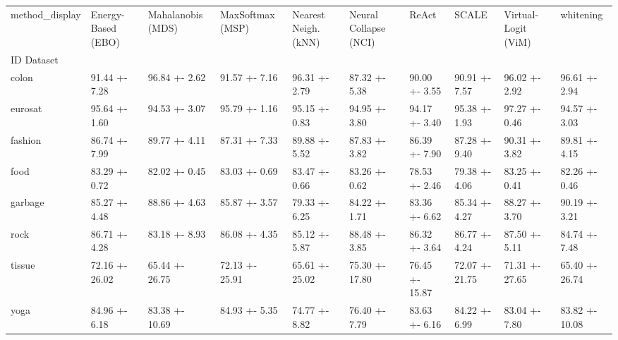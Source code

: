 \begin{tabular}{llllllllll}
\toprule
method_display & Energy-Based (EBO) & Mahalanobis (MDS) & MaxSoftmax (MSP) & Nearest Neigh. (kNN) & Neural Collapse (NCI) & ReAct & SCALE & Virtual-Logit (ViM) & whitening \\
ID Dataset &  &  &  &  &  &  &  &  &  \\
\midrule
colon & 91.44 +- 7.28 & 96.84 +- 2.62 & 91.57 +- 7.16 & 96.31 +- 2.79 & 87.32 +- 5.38 & 90.00 +- 3.55 & 90.91 +- 7.57 & 96.02 +- 2.92 & 96.61 +- 2.94 \\
eurosat & 95.64 +- 1.60 & 94.53 +- 3.07 & 95.79 +- 1.16 & 95.15 +- 0.83 & 94.95 +- 3.80 & 94.17 +- 3.40 & 95.38 +- 1.93 & 97.27 +- 0.46 & 94.57 +- 3.03 \\
fashion & 86.74 +- 7.99 & 89.77 +- 4.11 & 87.31 +- 7.33 & 89.88 +- 5.52 & 87.83 +- 3.82 & 86.39 +- 7.90 & 87.28 +- 9.40 & 90.31 +- 3.82 & 89.81 +- 4.15 \\
food & 83.29 +- 0.72 & 82.02 +- 0.45 & 83.03 +- 0.69 & 83.47 +- 0.66 & 83.26 +- 0.62 & 78.53 +- 2.46 & 79.38 +- 4.06 & 83.25 +- 0.41 & 82.26 +- 0.46 \\
garbage & 85.27 +- 4.48 & 88.86 +- 4.63 & 85.87 +- 3.57 & 79.33 +- 6.25 & 84.22 +- 1.71 & 83.36 +- 6.62 & 85.34 +- 4.27 & 88.27 +- 3.70 & 90.19 +- 3.21 \\
rock & 86.71 +- 4.28 & 83.18 +- 8.93 & 86.08 +- 4.35 & 85.12 +- 5.87 & 88.48 +- 3.85 & 86.32 +- 3.64 & 86.77 +- 4.24 & 87.50 +- 5.11 & 84.74 +- 7.48 \\
tissue & 72.16 +- 26.02 & 65.44 +- 26.75 & 72.13 +- 25.91 & 65.61 +- 25.02 & 75.30 +- 17.80 & 76.45 +- 15.87 & 72.07 +- 21.75 & 71.31 +- 27.65 & 65.40 +- 26.74 \\
yoga & 84.96 +- 6.18 & 83.38 +- 10.69 & 84.93 +- 5.35 & 74.77 +- 8.82 & 76.40 +- 7.79 & 83.63 +- 6.16 & 84.22 +- 6.99 & 83.04 +- 7.80 & 83.82 +- 10.08 \\
\bottomrule
\end{tabular}
